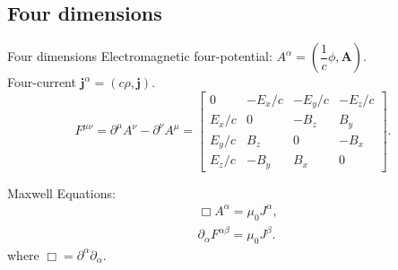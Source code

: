 \subsection{Four dimensions}

\begin{frame}{Four dimensions}
    Electromagnetic four-potential: \( A^\alpha = \left( \dfrac{1}{c} \phi, \mathbf{A} \right) \). \cite{Jackson_1998} \\
    Four-current \( \mathbf{j}^\alpha = ( c \rho, \mathbf{j} ) \).
    \begin{equation*}
        F^{\mu\nu} = \partial^{\mu}A^{\nu} - \partial^{\nu}A^{\mu} =
        \begin{bmatrix}
                0   & -E_x/c & -E_y/c & -E_z/c \\
                E_x/c &    0   & -B_z   &  B_y   \\
                E_y/c &  B_z   &    0   & -B_x   \\
                E_z/c & -B_y   &  B_x   &  0
        \end{bmatrix}
        .
    \end{equation*}

    Maxwell Equations:
    \begin{align*}
        & \Box A^\alpha = \mu_0 J^\alpha, \\
        & \partial_\alpha F^{\alpha\beta} = \mu_0 J^\beta.
    \end{align*}
    where \( \Box = \partial^\alpha \partial_\alpha \).
    
\end{frame}